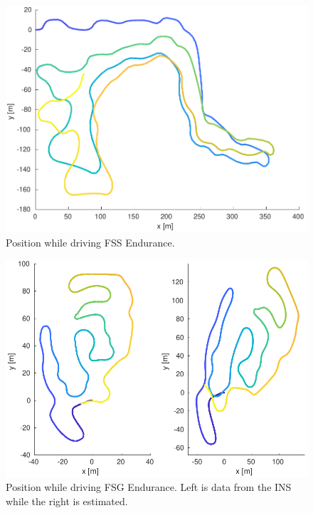 \begin{figure}
    \centering
    \includegraphics[width=0.8\linewidth]{0_Images/6_Results/positionFSSEndurance.pdf}
    \caption[Position while driving FSS Endurance.]
    {Position while driving FSS Endurance.}
    \label{Fig:PosFSSEndurance}
\end{figure}



\begin{figure}
    \centering
    \includegraphics[width=0.8\linewidth]{0_Images/6_Results/positionFSGEndurance.pdf}
    \caption[Position while driving FSG Endurance.]
    {Position while driving FSG Endurance. Left is data from the INS while the right is estimated.}
    \label{Fig:PosFSGEndurance}
\end{figure}


